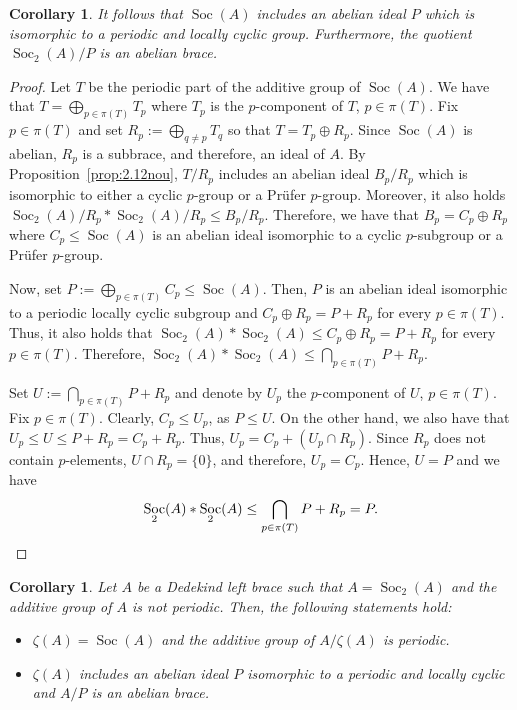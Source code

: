 \documentclass[12pt, a4paper, english]{article}
\newtheorem{corolari}[teorema]{Corollary}
\theoremstyle{definition}
\DeclareMathOperator{\Soc}{Soc}
\begin{document}
\begin{corolari}
\label{cor:2.13nou}
It follows that $\Soc(A)$ includes an abelian ideal $P$ which is isomorphic to a periodic and locally cyclic group. Furthermore, the quotient $\Soc_2(A)/P$ is an abelian brace.
\end{corolari}

\begin{proof}
Let $T$ be the periodic part of the additive group of $\Soc(A)$. We have that $T = \bigoplus_{p \in \pi(T)} T_p$ where $T_p$ is the $p$-component of $T$, $p \in \pi(T)$. Fix $p\in \pi(T)$ and set $R_p := \bigoplus_{q\neq p} T_q$ so that $T = T_p \oplus R_p$. Since $\Soc(A)$ is abelian, $R_p$ is a subbrace, and therefore, an ideal of $A$. By Proposition~\ref{prop:2.12nou}, $T/R_p$ includes an abelian ideal $B_p/R_p$ which is isomorphic to either a cyclic $p$-group or a Prüfer $p$-group. Moreover, it also holds $\Soc_2(A)/R_p \ast \Soc_2(A)/R_p \leq B_p/R_p$. Therefore, we have that $B_p = C_p \oplus R_p$ where $C_p \leq \Soc(A)$ is an abelian ideal isomorphic to a cyclic $p$-subgroup or a Prüfer $p$-group. 

Now, set $P:= \bigoplus_{p \in \pi(T)} C_p \leq \Soc(A)$. Then, $P$ is an abelian ideal isomorphic to a periodic locally cyclic subgroup and $C_p \oplus R_p = P + R_p$ for every $p \in \pi(T)$. Thus, it also holds that $\Soc_2(A) \ast \Soc_2(A) \leq C_p \oplus R_p = P + R_p$ for every $p\in \pi(T)$. Therefore, $\Soc_2(A) \ast \Soc_2(A) \leq \bigcap_{p \in \pi(T)} P + R_p$. 

Set $U:= \bigcap_{p\in \pi(T)} P + R_p$ and denote by $U_p$ the $p$-component of $U$, $p \in \pi(T)$. Fix $p \in \pi(T)$. Clearly, $C_p \leq U_p$, as $P \leq U$. On the other hand, we also have that $U_p \leq U \leq P + R_p = C_p + R_p$. Thus, $U_p = C_p + (U_p \cap R_p)$. Since $R_p$ does not contain $p$-elements, $U \cap R_p = \{0\}$, and therefore, $U_p = C_p$. Hence, $U = P$ and we have
\[ \Soc_2(A) \ast \Soc_2(A) \leq \bigcap_{p \in \pi(T)} P + R_p = P. \qedhere \]
\end{proof}


\begin{corolari}
\label{cor:2.15nou}
Let $A$ be a Dedekind left brace such that $A = \Soc_2(A)$ and the additive group of $A$ is not periodic. Then, the following statements hold:
\begin{itemize}
\item $\zeta(A) = \Soc(A)$ and the additive group of $A/\zeta(A)$ is periodic.
\item $\zeta(A)$ includes an abelian ideal $P$ isomorphic to a periodic and locally cyclic and $A/P$ is an abelian brace.
\end{itemize}
\end{corolari}
\end{document}
